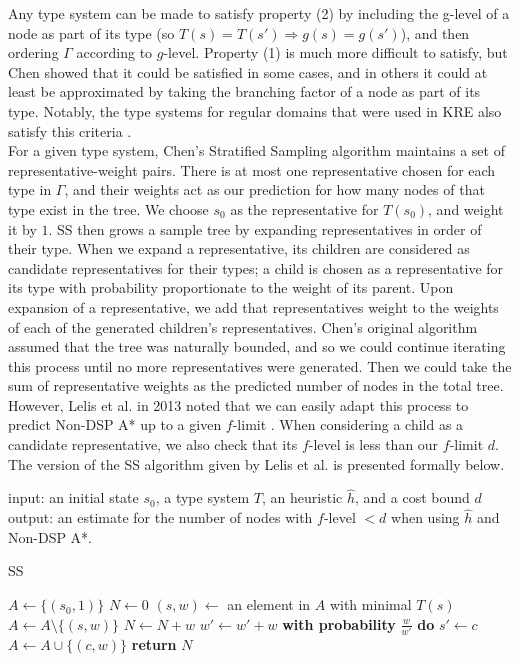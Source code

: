 \documentclass{article}
\begin{document}
Any type system can be made to satisfy property (2) by including the g-level of a node as part of its type (so \(T(s) = T(s') \Rightarrow g(s) = g(s')\)),
and then ordering \(\Gamma\) according to \(g\)-level.
Property (1) is much more difficult to satisfy, but Chen showed that it could be satisfied in some cases,
and in others it could at least be approximated by taking the branching factor of a node as part of its type.
Notably, the type systems for regular domains
that were used in KRE also satisfy this criteria \cite{edelkamp1998branching, korf2001time}. \\

For a given type system, Chen's Stratified Sampling algorithm maintains a set of representative-weight pairs.
There is at most one representative chosen for each type in \(\Gamma\),
and their weights act as our prediction for how many nodes of that type exist in the tree.
We choose \(s_0\) as the representative for \(T(s_0)\), and weight it by \(1\).
SS then grows a sample tree by expanding representatives in order of their type.
When we expand a representative, its children are considered as candidate representatives for their types;
a child is chosen as a representative for its type with probability proportionate to the weight of its parent.
Upon expansion of a representative, we add that representatives weight to the weights of each of the generated children's representatives. 
Chen's original algorithm assumed that the tree was naturally bounded,
and so we could continue iterating this process until no more representatives were generated.
Then we could take the sum of representative weights as the predicted number of nodes in the total tree.
However, Lelis et al. in 2013 noted that we can easily adapt this process to predict Non-DSP A*
up to a given \(f\)-limit \cite{lelis2013predicting}.
When considering a child as a candidate representative, we also check that its \(f\)-level is less than our \(f\)-limit \(d\).
The version of the SS algorithm given by Lelis et al. is presented formally below. \\

\begin{algorithm}
  input: an initial state \(s_0\), a type system \(T\), an heuristic \(\hat{h}\), and a cost bound \(d\) \\
  output: an estimate for the number of nodes with \(f\)-level \(< d\) when using \(\hat{h}\) and Non-DSP A*.
\caption{SS}\label{euclid}
\begin{algorithmic}[1]
  \State $A \gets \{(s_0, 1)\}$
  \State \(N \gets 0\)
  \State \((s, w) \gets\) an element in \(A\) with minimal \(T(s)\)
  \State \(A \gets A \setminus \{(s,w)\}\)
  \State \(N \gets N + w\)
  \State \(w' \gets w' + w\)
  \State \textbf{with probability} \(\frac{w}{w'}\) \textbf{do} \(s' \gets c\)
  \Else
  \State \(A \gets A \cup \{(c, w)\}\)
  \EndIf
  \EndIf
  \EndFor
  \EndWhile
\State \textbf{return }\(N\)
\end{algorithmic}
\end{algorithm}
\end{document}
